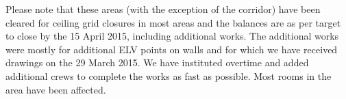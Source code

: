Please note that these areas (with the exception of the corridor) have been cleared for ceiling grid closures in most areas and the balances are as per target to close by the 15 April 2015, including additional works. The additional works were mostly for additional ELV points on walls and for which we have received drawings on the 29 March 2015. We have instituted overtime and added additional crews to complete the works as fast as possible. Most rooms in the area have been affected. 

\begin{comment}
\chapter{Busbar System}

As per the approved Baseline Program we expected to place the busbar order for all three hotels on 27 February 2014. However, HLS DSE-JV were unable to place any orders due to the events that are outlined below, with finality on all busbars only achieved in April 2015. 

\begin{enumerate}
\item On the 23 December 2013 we were requested to change the specification for some busbars via HLG transmittal Ref. No. HLG-626-DT-HLS-0628 dated 23 Decemeber 2013 \textit{Fire Resistance Bus Bar Specification}.

\item On the 25 February 2014 we were issued revised designs via tranmittal Ref. No. HLG-626-DT-HLS-0873 \textit{Revised Electrical Drawings}.

\end{enumerate}


\chapter{Generators}

\section{Generator Ventilation}

\subsection{Background}

The original tender drawings indicated the Generator Ventilation to be by means of Louvres. When such an approach is taken normally the ventilation openings are dictated by the size of the generators.



\end{comment}
